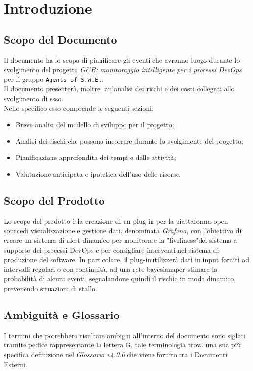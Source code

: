 \section{Introduzione
\label{Introduzione}}

\subsection{Scopo del Documento}
Il documento ha lo scopo di pianificare gli eventi che avranno luogo durante lo svolgimento del progetto \textit{G\&B: monitoraggio intelligente per i processi DevOps\glossario} per il gruppo \texttt{Agents of S.W.E.}.\\
Il documento presenterà, inoltre, un'analisi dei rischi e dei costi collegati allo svolgimento di esso. \\
Nello specifico esso comprende le seguenti sezioni:
\begin{itemize}
\item Breve analisi del modello di sviluppo per il progetto;
\item Analisi dei rischi che possono incorrere durante lo svolgimento del progetto;
\item Pianificazione approfondita dei tempi e delle attività;
\item Valutazione anticipata e ipotetica dell'uso delle risorse.
\end{itemize}
 
\subsection{Scopo del Prodotto} 
Lo scopo del prodotto è la creazione di un plug-in per la piattaforma open source\glossario di visualizzazione e gestione dati, denominata \textit{Grafana}\glossario, 
con l'obiettivo di creare un sistema di alert dinamico per monitorare la "liveliness"\glossario del sistema a supporto dei processi
DevOps e per consigliare interventi nel sistema di produzione del software.
In particolare, il plug-in\glossario utilizzerà dati in input forniti ad intervalli regolari o con continuità, ad una rete bayesiana\glossario per stimare la probabilità di alcuni eventi, segnalandone quindi il rischio in modo dinamico, prevenendo situazioni di stallo.   

 
\subsection{Ambiguità e Glossario}
I termini che potrebbero risultare ambigui all'interno del documento sono siglati tramite pedice rappresentante la lettera \textmd{G}, tale terminologia trova una sua più specifica definizione nel \textit{Glossario v4.0.0} che viene fornito tra i Documenti Esterni.


